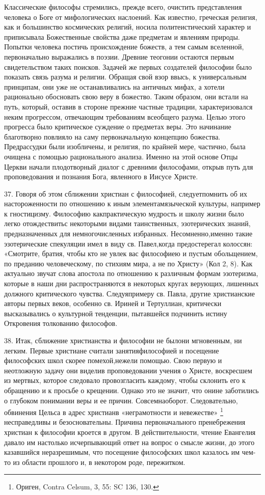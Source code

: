 \documentclass[a5paper,10pt]{article}
\begin{document}
Классические философы стремились, прежде всего, очистить представления человека
о Боге от мифологических наслоений. Как известно, греческая религия, как и
большинство космических религий, носила политеистический характер и приписывала
Божественные свойства даже предметам и явлениям природы. Попытки человека
постичь происхождение божеств, а тем самым вселенной, первоначально выражались
в поэзии. Древние теогонии остаются первым свидетельством таких поисков.
Задачей же первых создателей философии было показать связь разума и религии.
Обращая свой взор ввысь, к универсальным принципам, они уже не останавливались
на античных мифах, а хотели рационально обосновать свою веру в божество. Таким
образом, они встали на путь, который, оставив в стороне прежние частные
традиции, характеризовался неким прогрессом, отвечающим требованиям всеобщего
разума. Целью этого прогресса было критическое суждение о предметах веры. Это
начинание благотворно повлияло на саму первоначальную концепцию божества.
Предрассудки были изобличены, и религия, по крайней мере, частично, была
очищена с помощью рационального анализа. Именно на этой основе Отцы Церкви
начали плодотворный диалог с древними философами, открыв путь для
проповедования и познания Бога, явленного в Иисусе Христе.

37. Говоря об этом сближении христиан с философией, следуетпомнить об их
настороженности по отношению к иным элементамязыческой культуры, например к
гностицизму. Философию какпрактическую мудрость и школу жизни было легко
отождествитьс некоторыми видами таинственных, эзотерических знаний,
предназначенных для немногочисленных избранных. Несомненно,именно такие
эзотерические спекуляции имел в виду св. Павел,когда предостерегал колоссян:
«Смотрите, братия, чтобы кто не увлек вас философиею и пустым обольщением, по
преданию человеческому, по стихиям мира, а не по Христу» (Кол 2, 8). Как
актуально звучат слова апостола по отношению к различным формам эзотеризма,
которые в наши дни распространяются в некоторых кругах верующих, лишенных
должного критического чувства. Следуяпримеру св. Павла, другие христианские
авторы первых веков, особенно св. Ириней и Тертуллиан, критически высказывались
о культурной тенденции, пытавшейся подчинить истину Откровения толкованию
философов.

38. Итак, сближение христианства и философии не былони мгновенным, ни легким.
Первые христиане считали занятияфилософией и посещение философских школ скорее
помехой,нежели помощью. Свою первую и неотложную задачу они виделив
проповедовании учения о Христе, воскресшем из мертвых, которое следовало
провозгласить каждому, чтобы склонить его к обращению и к просьбе о крещении.
Однако это не значит, что онине заботились о глубоком понимании веры и ее
причин. Совсемнаоборот. Следовательно, обвинения Цельса в адрес христианв
«неграмотности и невежестве» \footnote{Ориген, Contra Celsum, 3, 55: SC 136,
130.}  несправедливы и безосновательны. Причина первоначального пренебрежения
христиан к философии кроется в другом. В действительности, чтение Евангелия
давало им настолько исчерпывающий ответ на вопрос о смысле жизни, до этого
казавшийся неразрешимым, что посещение философских школ казалось им чем-то из
области прошлого и, в некотором роде, пережитком.
\end{document}
